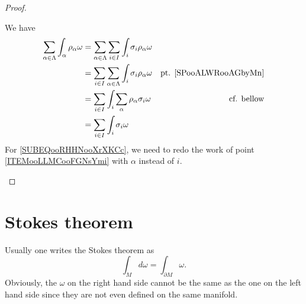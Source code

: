 \begin{proof}
\begin{subproof}
		\begin{subproof}

					\label{SPooALWRooAGbyMn}


			\spitem[Conclusion]
			We have
			\begin{subequations}
				\begin{align}
					\sum_{\alpha\in \Lambda}\int_{\alpha}\rho_{\alpha}\omega & =\sum_{\alpha\in\Lambda}\sum_{i\in I}\int_i\sigma_i\rho_{\alpha}\omega                                                \\
					                                                         & =\sum_{i\in I}\sum_{\alpha\in\Lambda}\int_i\sigma_i\rho_{\alpha}\omega & \text{pt. \ref{SPooALWRooAGbyMn}}            \\
					                                                         & =\sum_{i\in I}\int_{i}\sum_{\alpha}\rho_{\alpha}\sigma_i\omega         & \text{cf. bellow}		\label{SUBEQooRHHNooXrXKCc} \\
					                                                         & = \sum_{i\in I}\int_i\sigma_i\omega
				\end{align}
			\end{subequations}
			For \eqref{SUBEQooRHHNooXrXKCc}, we need to redo the work of point \ref{ITEMooLLMCooFGNsYmi} with \( \alpha\) instead of \( i\).
		\end{subproof}
	\end{subproof}
\end{proof}

\section{Stokes theorem}

Usually one writes the Stokes theorem as
\begin{equation}
	\int_Md\omega=\int_{\partial M}\omega.
\end{equation}
Obviously, the \( \omega\) on the right hand side cannot be the same as the one on the left hand side since they are not even defined on the same manifold.

